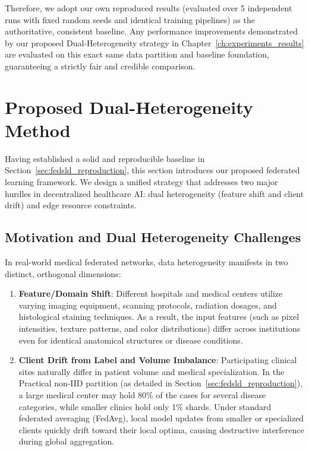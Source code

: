 Therefore, we adopt our own reproduced results (evaluated over 5 independent runs with fixed random seeds and identical training pipelines) as the authoritative, consistent baseline. Any performance improvements demonstrated by our proposed Dual-Heterogeneity strategy in Chapter~\ref{ch:experiments_results} are evaluated on this exact same data partition and baseline foundation, guaranteeing a strictly fair and credible comparison.

\section{Proposed Dual-Heterogeneity Method}
\label{sec:proposed_method}

Having established a solid and reproducible baseline in Section~\ref{sec:fedsld_reproduction}, this section introduces our proposed federated learning framework. We design a unified strategy that addresses two major hurdles in decentralized healthcare AI: dual heterogeneity (feature shift and client drift) and edge resource constraints.

\subsection{Motivation and Dual Heterogeneity Challenges}
\label{subsec:motivation_dual_heterogeneity}

In real-world medical federated networks, data heterogeneity manifests in two distinct, orthogonal dimensions:
\begin{enumerate}
    \item \textbf{Feature/Domain Shift}: Different hospitals and medical centers utilize varying imaging equipment, scanning protocols, radiation dosages, and histological staining techniques. As a result, the input features (such as pixel intensities, texture patterns, and color distributions) differ across institutions even for identical anatomical structures or disease conditions.
    \item \textbf{Client Drift from Label and Volume Imbalance}: Participating clinical sites naturally differ in patient volume and medical specialization. In the Practical non-IID partition (as detailed in Section~\ref{sec:fedsld_reproduction}), a large medical center may hold 80\% of the cases for several disease categories, while smaller clinics hold only 1\% shards. Under standard federated averaging (FedAvg), local model updates from smaller or specialized clients quickly drift toward their local optima, causing destructive interference during global aggregation.
\end{enumerate}

